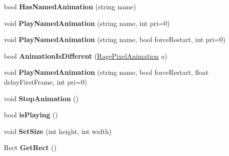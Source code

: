 \begin{DoxyCompactItemize}
\item 
\hypertarget{class_rage_pixel_sprite_a8099728fcb040eb0df549263f58a1a43}{bool {\bfseries Has\-Named\-Animation} (string name)}\label{class_rage_pixel_sprite_a8099728fcb040eb0df549263f58a1a43}

\item 
\hypertarget{class_rage_pixel_sprite_a8096c5255560cb25ee9af38282825bf2}{void {\bfseries Play\-Named\-Animation} (string name, int pri=0)}\label{class_rage_pixel_sprite_a8096c5255560cb25ee9af38282825bf2}

\item 
\hypertarget{class_rage_pixel_sprite_a55e3e799da237798826536b4c8e0358b}{void {\bfseries Play\-Named\-Animation} (string name, bool force\-Restart, int pri=0)}\label{class_rage_pixel_sprite_a55e3e799da237798826536b4c8e0358b}

\item 
\hypertarget{class_rage_pixel_sprite_a8d7023360b540e206c3a2c15e6f0801a}{bool {\bfseries Animation\-Is\-Different} (\hyperlink{class_rage_pixel_animation}{Rage\-Pixel\-Animation} a)}\label{class_rage_pixel_sprite_a8d7023360b540e206c3a2c15e6f0801a}

\item 
\hypertarget{class_rage_pixel_sprite_ab70e1719c79f8e0589e2bdb8c8c54bcf}{void {\bfseries Play\-Named\-Animation} (string name, bool force\-Restart, float delay\-First\-Frame, int pri=0)}\label{class_rage_pixel_sprite_ab70e1719c79f8e0589e2bdb8c8c54bcf}

\item 
\hypertarget{class_rage_pixel_sprite_a54be5b5042a4ba6823ba6aee7fdf45db}{void {\bfseries Stop\-Animation} ()}\label{class_rage_pixel_sprite_a54be5b5042a4ba6823ba6aee7fdf45db}

\item 
\hypertarget{class_rage_pixel_sprite_a7bb73e4f901a24ebd575741b039406cf}{bool {\bfseries is\-Playing} ()}\label{class_rage_pixel_sprite_a7bb73e4f901a24ebd575741b039406cf}

\item 
\hypertarget{class_rage_pixel_sprite_a839ac9cf6b178d5631b5b6dd8e5d81ab}{void {\bfseries Set\-Size} (int height, int width)}\label{class_rage_pixel_sprite_a839ac9cf6b178d5631b5b6dd8e5d81ab}

\item 
\hypertarget{class_rage_pixel_sprite_afd16f57c9ad6f99ff45a46fa518d6562}{Rect {\bfseries Get\-Rect} ()}\label{class_rage_pixel_sprite_afd16f57c9ad6f99ff45a46fa518d6562}


\end{DoxyCompactItemize}
